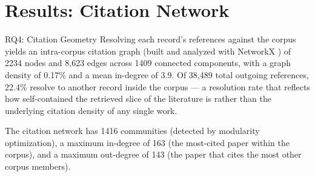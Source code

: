 \documentclass[
  ignorenonframetext,
]{beamer}
\author{\texorpdfstring{}{}}
\date{}
\begin{document}
\section{Results: Citation Network}\label{results-citation-network}

\begin{frame}[allowframebreaks]{RQ4: Citation Geometry}
\protect{}\label{rq4-citation-geometry}
Resolving each record's references against the corpus yields an
intra-corpus citation graph (built and analyzed with NetworkX
) of 2234 nodes and 8,623 edges across 1409
connected components, with a graph density of 0.17\% and a mean
in-degree of 3.9. Of 38,489 total outgoing references, 22.4\% resolve to
another record inside the corpus --- a resolution rate that reflects how
self-contained the retrieved slice of the literature is rather than the
underlying citation density of any single work.

The citation network has 1416 communities (detected by modularity
optimization), a maximum in-degree of 163 (the most-cited paper within
the corpus), and a maximum out-degree of 143 (the paper that cites the
most other corpus members).
\end{frame}
\end{document}

